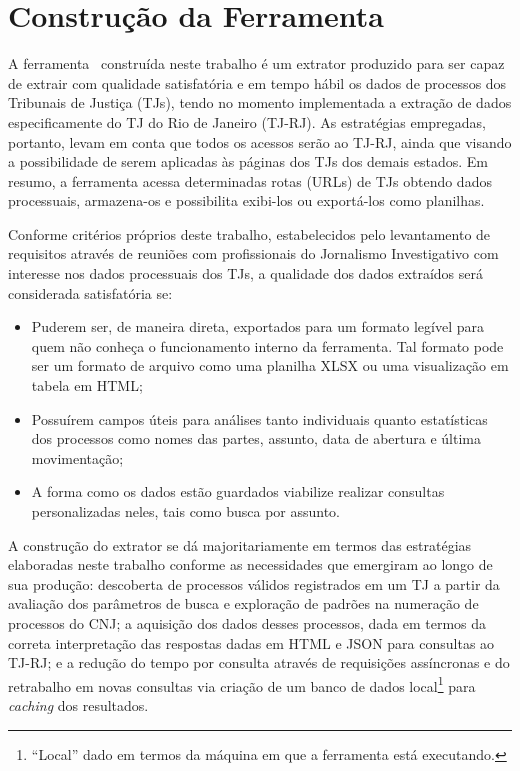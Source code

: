 \chapter{Construção da Ferramenta \tjscraper~\label{chp:construção-da-ferramenta}}

A ferramenta \tjscraper~construída neste trabalho é um extrator produzido para
ser capaz de extrair com qualidade satisfatória e em tempo hábil os dados de
processos dos Tribunais de Justiça (TJs), tendo no momento implementada a
extração de dados especificamente do TJ do Rio de Janeiro (TJ-RJ). As
estratégias empregadas, portanto, levam em conta que todos os acessos serão ao
TJ-RJ, ainda que visando a possibilidade de serem aplicadas às páginas dos TJs
dos demais estados. Em resumo, a ferramenta acessa determinadas rotas (URLs) de
TJs obtendo dados processuais, armazena-os e possibilita exibi-los ou
exportá-los como planilhas.

Conforme critérios próprios deste trabalho, estabelecidos pelo levantamento de
requisitos através de reuniões com profissionais do Jornalismo Investigativo
com interesse nos dados processuais dos TJs, a qualidade dos dados extraídos
será considerada satisfatória se:

\begin{itemize}
    \item Puderem ser, de maneira direta, exportados para um formato legível
        para quem não conheça o funcionamento interno da ferramenta. Tal
        formato pode ser um formato de arquivo como uma planilha XLSX ou uma
        visualização em tabela em HTML;
    \item Possuírem campos úteis para análises tanto individuais quanto
        estatísticas dos processos como nomes das partes, assunto, data de
        abertura e última movimentação;
    \item A forma como os dados estão guardados viabilize realizar consultas
        personalizadas neles, tais como busca por assunto.
\end{itemize}

A construção do extrator se dá majoritariamente em termos das estratégias
elaboradas neste trabalho conforme as necessidades que emergiram ao longo de
sua produção: descoberta de processos válidos registrados em um TJ a partir da
avaliação dos parâmetros de busca e exploração de padrões na numeração de
processos do CNJ; a aquisição dos dados desses processos, dada em termos da
correta interpretação das respostas dadas em HTML e JSON para consultas ao
TJ-RJ; e a redução do tempo por consulta através de requisições assíncronas e
do retrabalho em novas consultas via criação de um banco de dados
local\footnote{``Local'' dado em termos da máquina em que a ferramenta está
executando.} para \textit{caching} dos resultados.


